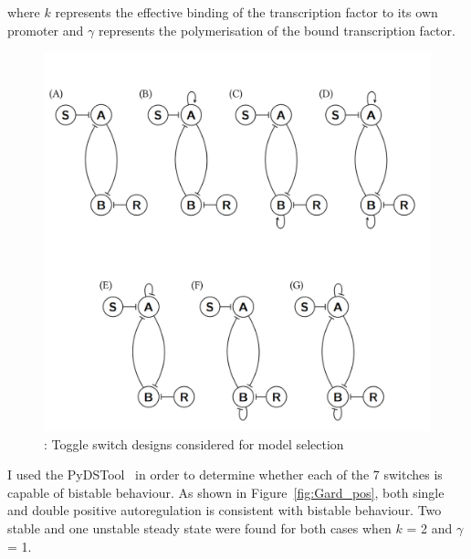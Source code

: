 where $k$ represents the effective binding of the transcription factor to its own promoter and $\gamma$ represents the polymerisation of the bound transcription factor. 


\begin{figure}[htbp]
	\begin{center}
\includegraphics[width=\textwidth]{../../chapters/chapterABCSysBio/images/toggle_switch_designs.png}
\caption[LoF caption]{\label{fig:toggle_switch_designs}: Toggle switch designs considered for model selection}
\end{center}
\end{figure}
\clearpage


I used the PyDSTool~\autocite{Clewley:2012kj} in order to determine whether each of the 7 switches is capable of bistable behaviour. As shown in Figure~\ref{fig:Gard_pos}, both single and double positive autoregulation is consistent with bistable behaviour. Two stable and one unstable steady state were found for both cases when $k$ = 2 and $\gamma$ = 1. 


